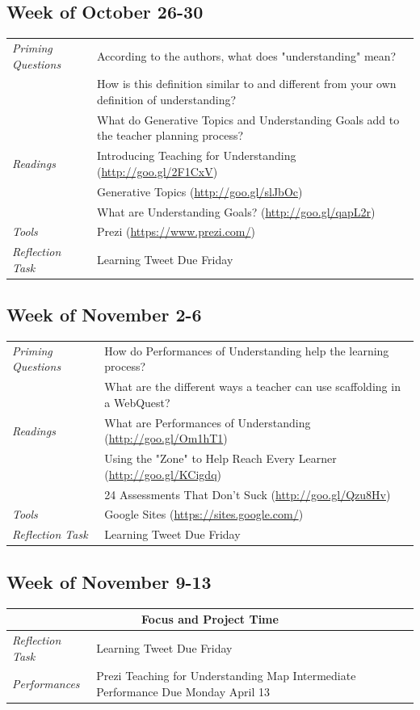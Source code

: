 \documentclass{tufte-handout}
\newcommand{\tabpq}{\faQuestionCircle\medspace\textit{Priming Questions}}
\newcommand{\tabread}{\faBook\medspace\textit{Readings}}
\newcommand{\tabperformance}{\faTasks\medspace\textit{Performances}}
\newcommand{\tabtools}{\faWrench\medspace\textit{Tools}}
\newcommand{\tabtweet}{\faLightbulbO\medspace\textit{Reflection Task} & Learning Tweet Due Friday \\}
\newenvironment{tabsched}
	{\small
	\begin{tabular}{p{1.5in}p{4.5in}}
	\toprule}
	{\bottomrule
	\end{tabular}
	\normalsize}
\newcommand{\weekeleven}{October 26-30}
\newcommand{\weektwelve}{November 2-6}
\newcommand{\weekthirteen}{November 9-13}
\begin{document}
\subsection{Week of \weekeleven}

\begin{tabsched}
	\tabpq & According to the authors, what does "understanding" mean? \\
	& How is this definition similar to and different from your own definition of understanding? \\
	& What do Generative Topics and Understanding Goals add to the teacher planning process? \\
	\midrule
	\tabread & Introducing Teaching for Understanding (\url{http://goo.gl/2F1CxV}) \\
	& Generative Topics (\url{http://goo.gl/slJbOc}) \\
	& What are Understanding Goals? (\url{http://goo.gl/qapL2r}) \\
	\midrule
	\tabtools & Prezi (\url{https://www.prezi.com/}) \\
	\midrule
	\tabtweet
\end{tabsched}

\subsection{Week of \weektwelve}

\begin{tabsched}
	\tabpq & How do Performances of Understanding help the learning process? \\
	& What are the different ways a teacher can use scaffolding in a WebQuest? \\
	\midrule
	\tabread & What are Performances of Understanding (\url{http://goo.gl/Om1hT1}) \\
	& Using the "Zone" to Help Reach Every Learner (\url{http://goo.gl/KCigdq}) \\
	& 24 Assessments That Don't Suck (\url{http://goo.gl/Qzu8Hv}) \\
	\midrule
	\tabtools & Google Sites (\url{https://sites.google.com/}) \\
	\midrule
	\tabtweet
\end{tabsched}

\subsection{Week of \weekthirteen}

\begin{tabsched}
	\multicolumn{2}{c}{\textbf{Focus and Project Time}} \\
	\midrule
	\tabtweet
	\midrule
	\tabperformance & Prezi Teaching for Understanding Map Intermediate Performance Due Monday April 13 \\
\end{tabsched}
\end{document}
